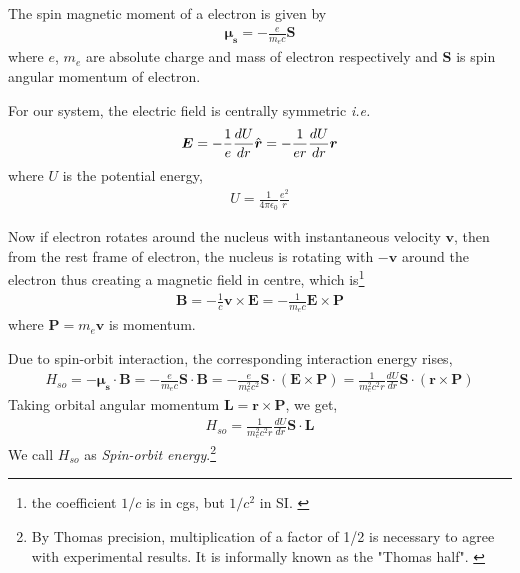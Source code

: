 \documentclass[11pt,a4paper]{article}
\numberwithin{equation}{section}
\begin{document}
The spin magnetic moment of a electron is given by
\begin{align}
	\boldsymbol{\mu_s}=-\frac{e}{m_ec}\boldsymbol{S}
\end{align}
where $e$, $m_e$ are absolute charge and mass of electron respectively and $\boldsymbol{S}$ is spin angular momentum of electron.

For our system, the electric field is centrally symmetric \textit{i.e.}
\begin{align}
	\boldsymbol{E}= -\frac{1}{e}\frac{dU}{dr}\Hat{\boldsymbol{r}}= -\frac{1}{er}\frac{dU}{dr}\boldsymbol{r}
\end{align} where $U$ is the potential energy, 
\begin{align}
	U = \frac{1}{4\pi\epsilon_0}\frac{e^2}{r}
\end{align}

Now if electron rotates around the nucleus with instantaneous velocity $\boldsymbol{v}$, then from the rest frame of electron, the nucleus is rotating with $-\boldsymbol{v}$ around the electron thus creating a magnetic field in centre, which is\footnote{the coefficient $1/c$ is in cgs, but $1/c^2$ in SI. \cite{relativity -wiki}} 
\begin{align}
	\boldsymbol{B} = -\frac{1}{c} \boldsymbol{v}\times\boldsymbol{E} = -\frac{1}{m_ec}\boldsymbol{E}\times\boldsymbol{P}
\end{align}where $\boldsymbol{P}=m_e\boldsymbol{v}$ is momentum.

Due to spin-orbit interaction, the corresponding interaction energy rises,
\begin{align}
	H_{so}= -\boldsymbol{\mu_s}\cdot \boldsymbol{B} = -\frac{e}{m_ec}\boldsymbol{S}\cdot\boldsymbol{B} =
	-\frac{e}{m_e^2c^2}\boldsymbol{S}\cdot(\boldsymbol{E}\times\boldsymbol{P}) 
	=\frac{1}{m_e^2c^2r}\frac{dU}{dr}\boldsymbol{S}\cdot(\boldsymbol{r}\times\boldsymbol{P})
\end{align} Taking orbital angular momentum $\boldsymbol{L}=\boldsymbol{r}\times\boldsymbol{P}$, we get,
\begin{align}
	H_{so}=\frac{1}{m_e^2c^2r}\frac{dU}{dr}\boldsymbol{S}\cdot\boldsymbol{L}
\end{align}
We call $H_{so}$ as \textit{Spin-orbit energy}.\footnote{By Thomas precision, multiplication of a factor of 1/2 is necessary to agree with experimental results. It is informally known as the "Thomas half". \cite{thomas}}
\end{document}
